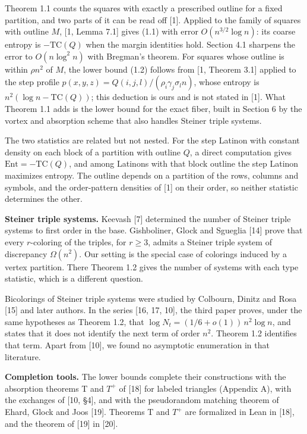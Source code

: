 \documentclass[english,11pt,a4paper]{article}
\begin{document}
Theorem 1.1 counts the squares with exactly a prescribed outline for a fixed partition, and two parts of it can be read off {[}1{]}. Applied to the family of squares with outline \(M\), {[}1, Lemma 7.1{]} gives (1.1) with error \(O(n^{3/2}\log n)\): its coarse entropy is \(-\mathrm{TC}(Q)\) when the margin identities hold. Section 4.1 sharpens the error to \(O(n\log^2 n)\) with Bregman's theorem. For squares whose outline is within \(\rho n^2\) of \(M\), the lower bound (1.2) follows from {[}1, Theorem 3.1{]} applied to the step profile \(p(x,y,z)=Q(i,j,l)/(\rho_i\gamma_j\sigma_l n)\), whose entropy is \(n^2(\log n-\mathrm{TC}(Q))\); this deduction is ours and is not stated in {[}1{]}. What Theorem 1.1 adds is the lower bound for the exact fiber, built in Section 6 by the vortex and absorption scheme that also handles Steiner triple systems.

The two statistics are related but not nested. For the step Latinon with constant density on each block of a partition with outline \(Q\), a direct computation gives \(\mathrm{Ent}=-\mathrm{TC}(Q)\), and among Latinons with that block outline the step Latinon maximizes entropy. The outline depends on a partition of the rows, columns and symbols, and the order-pattern densities of {[}1{]} on their order, so neither statistic determines the other.

\textbf{Steiner triple systems.} Keevash {[}7{]} determined the number of Steiner triple systems to first order in the base. Gishboliner, Glock and Sgueglia {[}14{]} prove that every \(r\)-coloring of the triples, for \(r\ge3\), admits a Steiner triple system of discrepancy \(\Omega(n^2)\). Our setting is the special case of colorings induced by a vertex partition. There Theorem 1.2 gives the number of systems with each type statistic, which is a different question.

Bicolorings of Steiner triple systems were studied by Colbourn, Dinitz and Rosa {[}15{]} and later authors. In the series {[}16, 17, 10{]}, the third paper proves, under the same hypotheses as Theorem 1.2, that \(\log N_t=(1/6+o(1))\,n^2\log n\), and states that it does not identify the next term of order \(n^2\). Theorem 1.2 identifies that term. Apart from {[}10{]}, we found no asymptotic enumeration in that literature.

\textbf{Completion tools.} The lower bounds complete their constructions with the absorption theorems T and \(T^+\) of {[}18{]} for labeled triangles (Appendix A), with the exchanges of {[}10, §4{]}, and with the pseudorandom matching theorem of Ehard, Glock and Joos {[}19{]}. Theorems T and \(T^+\) are formalized in Lean in {[}18{]}, and the theorem of {[}19{]} in {[}20{]}.
\end{document}
